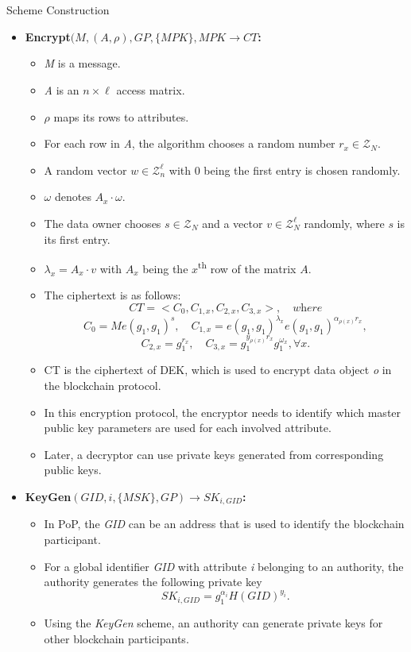 \documentclass[11pt]{beamer}
\begin{document}
\begin{frame}[allowframebreaks]{Scheme Construction}
\begin{itemize}
\item \textbf{Encrypt$(M, (A, \rho), GP, \{MPK\},\hat{MPK} \rightarrow CT$:}
	\begin{itemize}
	\item \textit{M} is a message.
	\item \textit{A} is an $n \times \ell$ access matrix.
	\item $\rho$ maps its rows to attributes.
	\item For each row in \textit{A}, the algorithm chooses a random number $r_x \in \mathcal{Z}_N$.
	\item A random vector $w \in \mathcal{Z}_n^\ell$ with 0 being the first entry is chosen randomly.
	\item $\omega$ denotes $A_x \cdot \omega$.
	\item The data owner chooses $s \in \mathcal{Z}_N$ and a vector $v \in \mathcal{Z}_N^\ell$ randomly, where $s$ is its first entry.
	\item $\lambda_x = A_x \cdot v$ with $A_x$ being the $x$\textsuperscript{th} row of the matrix $A$.
	\item The ciphertext is as follows:
	\[CT=<C_0, C_{1,x}, C_{2,x}, C_{3,x}>, \quad \textit{where} \]
	\[C_0 = Me(g_1,g_1)^s, \quad C_{1,x} = e(g_1,g_1)^{\lambda_x} e(g_1,g_1)^{\alpha_{\rho(x)} r_x},\]
	\[C_{2,x} = g_1^{r_x}, \quad C_{3,x} = g_1^{y_{\rho(x)} r_x} g_1 ^{\omega_x}, \forall x.\]
	\item CT is the ciphertext of DEK, which is used to encrypt data object \textit{o} in the blockchain protocol.
	\item In this encryption protocol, the encryptor needs to identify which master public key parameters are used for each involved attribute.
	\item Later, a decryptor can use private keys generated from corresponding public keys.
	\end{itemize}

\item \textbf{KeyGen$(GID, i, \{MSK\}, GP) \rightarrow SK_{i, GID}$:}
	\begin{itemize}
	\item In PoP, the \textit{GID} can be an address that is used to identify the blockchain participant.
	\item For a global identifier \textit{GID} with attribute \textit{i} belonging to an authority, the authority generates the following private key
	\[SK_{i, GID} = g_1^{\alpha_	i} H(GID)^{y_i}.\]
	\item Using the \textit{KeyGen} scheme, an authority can generate private keys for other blockchain participants.
	\end{itemize}


\end{itemize}
\end{frame}
\end{document}

